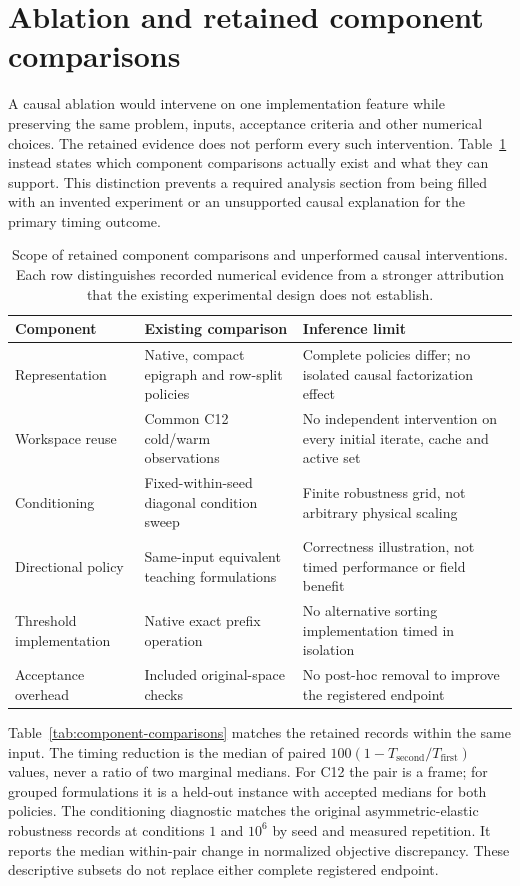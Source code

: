 \section{Ablation and retained component comparisons}\label{sec:ablation}
A causal ablation would intervene on one implementation feature
while preserving the same problem, inputs, acceptance criteria and
other numerical choices. The retained evidence does not perform
every such intervention. Table~\ref{tab:ablation} instead states
which component comparisons actually exist and what they can
support. This distinction prevents a required analysis section
from being filled with an invented experiment or an unsupported
causal explanation for the primary timing outcome.

\begin{table}[htbp]\centering\small
\caption{Scope of retained component comparisons and unperformed causal interventions. Each row distinguishes recorded numerical evidence from a stronger attribution that the existing experimental design does not establish.}\label{tab:ablation}
\begin{tabularx}{\textwidth}{@{}lXX@{}}\toprule
Component & Existing comparison & Inference limit\\\midrule
Representation & Native, compact epigraph and row-split policies & Complete policies differ; no isolated causal factorization effect\\
Workspace reuse & Common C12 cold/warm observations & No independent intervention on every initial iterate, cache and active set\\
Conditioning & Fixed-within-seed diagonal condition sweep & Finite robustness grid, not arbitrary physical scaling\\
Directional policy & Same-input equivalent teaching formulations & Correctness illustration, not timed performance or field benefit\\
Threshold implementation & Native exact prefix operation & No alternative sorting implementation timed in isolation\\
Acceptance overhead & Included original-space checks & No post-hoc removal to improve the registered endpoint\\\bottomrule
\end{tabularx}
\end{table}



Table~\ref{tab:component-comparisons} matches the retained records
within the same input. The timing reduction is the median of paired
$100(1-T_{\mathrm{second}}/T_{\mathrm{first}})$ values, never a ratio
of two marginal medians. For C12 the pair is a frame; for grouped
formulations it is a held-out instance with accepted medians for both
policies. The conditioning diagnostic matches the original
asymmetric-elastic robustness records at conditions $1$ and $10^6$
by seed and measured repetition. It reports the median within-pair
change in normalized objective discrepancy. These descriptive
subsets do not replace either complete registered endpoint.

